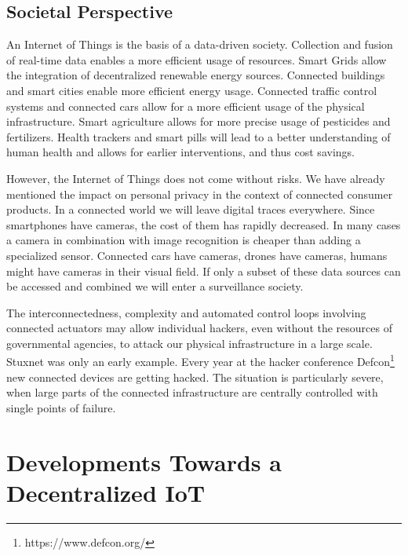 \subsection{Societal Perspective}

An Internet of Things is the basis of a data-driven society. Collection and fusion of real-time data enables a more efficient usage of resources. Smart Grids allow the integration of decentralized renewable energy sources. Connected buildings and smart cities enable more efficient energy usage. Connected traffic control systems and connected cars allow for a more efficient usage of the physical infrastructure. Smart agriculture allows for more precise usage of pesticides and fertilizers. Health trackers and smart pills will lead to a better understanding of human health and allows for earlier interventions, and thus cost savings. 

However, the Internet of Things does not come without risks. We have already mentioned the impact on personal privacy in the context of connected consumer products. In a connected world we will leave digital traces everywhere. Since smartphones have cameras, the cost of them has rapidly decreased. In many cases a camera in combination with image recognition is cheaper than adding a specialized sensor. Connected cars have cameras, drones have cameras, humans might have cameras in their visual field. If only a subset of these data sources can be accessed and combined we will enter a surveillance society. 

The interconnectedness, complexity and automated control loops involving connected actuators may allow individual hackers, even without the resources of governmental agencies, to attack our physical infrastructure in a large scale. Stuxnet \parencite{5772960} was only an early example. Every year at the hacker conference Defcon\footnote{https://www.defcon.org/} new connected devices are getting hacked. The situation is particularly severe, when large parts of the connected infrastructure are centrally controlled with single points of failure. 


\section{Developments Towards a Decentralized IoT}

